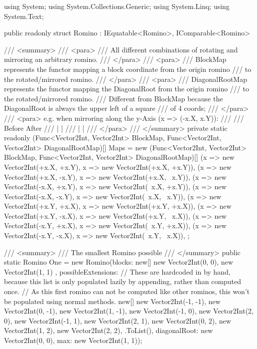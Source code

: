 \documentclass[a4paper,10pt,ngerman]{scrartcl}
\begin{document}
\begin{lstcs}
using System;
using System.Collections.Generic;
using System.Linq;
using System.Text;

public readonly struct Romino : IEquatable<Romino>, IComparable<Romino>
{
    /// <summary>
    /// <para>
    /// All different combinations of rotating and mirroring an arbitrary romino.
    /// </para>
    /// <para>
    /// BlockMap represents the functor mapping a block coordinate from the origin romino
    ///   to the rotated/mirrored romino.
    /// </para>
    /// <para>
    /// DiagonalRootMap represents the functor mapping the DiagonalRoot from the origin romino
    ///   to the rotated/mirrored romino.
    ///   Different from BlockMap because the DiagonalRoot is always the upper left of a square
    ///   of 4 coords; 
    /// </para>
    /// <para>    e.g. when mirroring along the y-Axis (x => (-x.X, x.Y)):
    /// 
    ///     Before  After
    ///       |       |
    ///       |       |
    /// </para>
    /// </summary>
    private static readonly (Func<Vector2Int, Vector2Int> BlockMap, Func<Vector2Int, Vector2Int> DiagonalRootMap)[] Maps = new (Func<Vector2Int, Vector2Int> BlockMap, Func<Vector2Int, Vector2Int> DiagonalRootMap)[]
    {
        (x => new Vector2Int(+x.X, +x.Y), x => new Vector2Int(+x.X, +x.Y)),
        (x => new Vector2Int(+x.X, -x.Y), x => new Vector2Int(+x.X, ~x.Y)),
        (x => new Vector2Int(-x.X, +x.Y), x => new Vector2Int(~x.X, +x.Y)),
        (x => new Vector2Int(-x.X, -x.Y), x => new Vector2Int(~x.X, ~x.Y)),
        (x => new Vector2Int(+x.Y, +x.X), x => new Vector2Int(+x.Y, +x.X)),
        (x => new Vector2Int(+x.Y, -x.X), x => new Vector2Int(+x.Y, ~x.X)),
        (x => new Vector2Int(-x.Y, +x.X), x => new Vector2Int(~x.Y, +x.X)),
        (x => new Vector2Int(-x.Y, -x.X), x => new Vector2Int(~x.Y, ~x.X)),
    };

    /// <summary>
    /// The smallest Romino possible
    /// </summary>
    public static Romino One =
        new Romino(blocks: new[] { new Vector2Int(0, 0), new Vector2Int(1, 1) },
            possibleExtensions:
            // These are hardcoded in by hand, because this list is only populated lazily by appending, rather than computed once.
            // As this first romino can not be computed like other rominos, this won't be populated using normal methods.
            new[] { new Vector2Int(-1, -1), new Vector2Int(0, -1), new Vector2Int(1, -1),
                    new Vector2Int(-1, 0),                                                new Vector2Int(2, 0),
                    new Vector2Int(-1, 1),                                                new Vector2Int(2, 1),
                                            new Vector2Int(0, 2),  new Vector2Int(1, 2),  new Vector2Int(2, 2), }
                .ToList(),
            diagonalRoot: new Vector2Int(0, 0),
            max: new Vector2Int(1, 1));

}
\end{lstcs}
\end{document}
